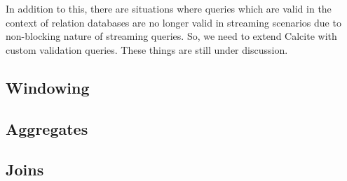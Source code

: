 \documentclass[10pt, conference, compsocconf]{IEEEtran}
\begin{document}
In addition to this, there are situations where queries which are valid in the context of relation databases are no longer valid in streaming scenarios due to non-blocking nature of streaming queries. So, we need to extend Calcite with custom validation queries. These things are still under discussion.

\subsection{Windowing}
\subsection{Aggregates}
\subsection{Joins}







\end{document}
